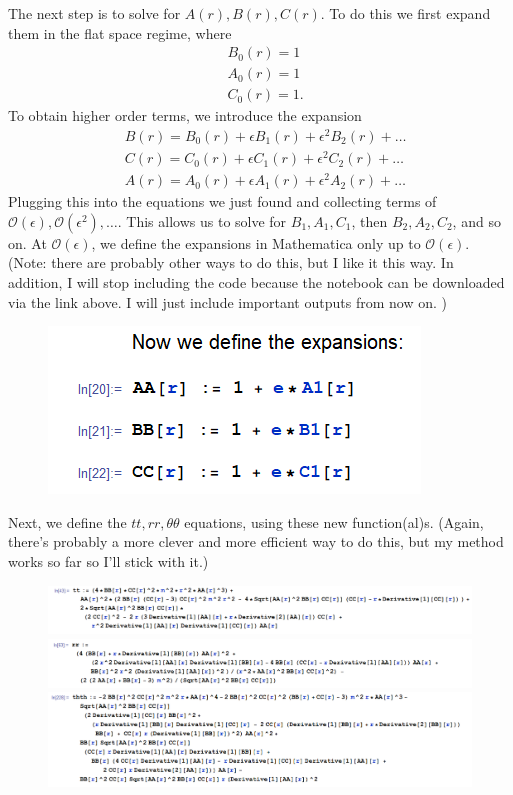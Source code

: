 \documentclass{book}
\theoremstyle{definition}
\begin{document}
The next step is to solve for $A(r), B(r), C(r)$. To do this we first expand them in the flat space regime, where
\begin{align}
&B_0(r) = 1\\
&A_0(r) = 1\\
&C_0(r) = 1.
\end{align}
To obtain higher order terms, we introduce the expansion
\begin{align}
&B(r) = B_0(r) + \epsilon B_1(r) + \epsilon^2 B_2(r) + \dots\\
&C(r) = C_0(r) + \epsilon C_1(r) + \epsilon^2 C_2(r) + \dots\\
&A(r) = A_0(r) + \epsilon A_1(r) + \epsilon^2 A_2(r) + \dots
\end{align}
Plugging this into the equations we just found and collecting terms of $\mathcal{O}(\epsilon), \mathcal{O}(\epsilon^2),\dots$. This allows us to solve for $B_1,A_1,C_1$, then $B_2,A_2,C_2$, and so on. At $\mathcal{O}(\epsilon)$, we define the expansions in Mathematica only up to $\mathcal{O}(\epsilon)$. (Note: there are probably other ways to do this, but I like it this way. In addition, I will stop including the code because the notebook can be downloaded via the link above. I will just include important outputs from now on. )
\begin{figure}[!htb]
	\centering
	\includegraphics[scale=0.5]{expand}
\end{figure}
Next, we define the $tt,rr,\theta\theta$ equations, using these new function(al)s. (Again, there's probably a more clever and more efficient way to do this, but my method works so far so I'll stick with it.)  
\begin{figure}[!htb]
	\centering
	\includegraphics[scale=0.4]{tt}
	\includegraphics[scale=0.4]{rr}
	\includegraphics[scale=0.4]{thth}
\end{figure}
\end{document}
